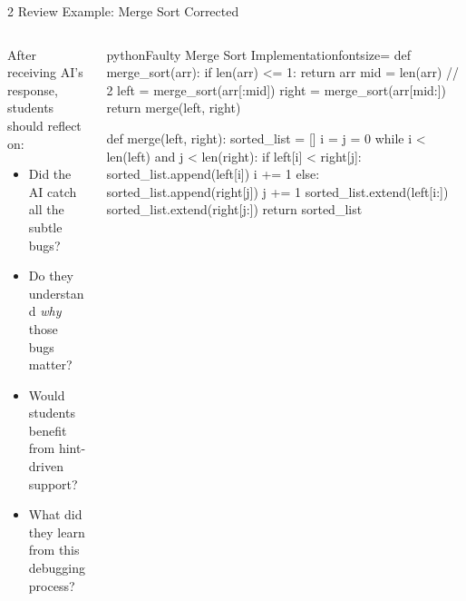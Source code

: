 \documentclass[xcolor=dvipsnames, aspectratio=169]{beamer}
\begin{document}
\begin{frame}[fragile]{2 Review Example: Merge Sort Corrected}
  \begin{columns}[T]
    \begin{column}{0.42\textwidth}
      After receiving AI's response, students should reflect on:
      \begin{itemize}
        \item Did the AI catch all the subtle bugs?
        \item Do they understand \textit{why} those bugs matter?
        \item Would students benefit from hint-driven support?
        \item What did they learn from this debugging process?
      \end{itemize}
    \end{column}
    
    \begin{column}{0.52\textwidth}
      \vspace{-1.5em}
      \begin{codeboxtc}{python}{Faulty Merge Sort Implementation}{}{fontsize=\scriptsize}
    def merge_sort(arr):
        if len(arr) <= 1:
            return arr
        mid = len(arr) // 2
        left = merge_sort(arr[:mid])
        right = merge_sort(arr[mid:])
        return merge(left, right)

    def merge(left, right):
        sorted_list = []
        i = j = 0
        while i < len(left) and j < len(right):
            if left[i] < right[j]:
                sorted_list.append(left[i])
                i += 1
            else:
                sorted_list.append(right[j])
                j += 1
        sorted_list.extend(left[i:])
        sorted_list.extend(right[j:])
        return sorted_list\end{codeboxtc}
    \end{column}
  \end{columns}
\end{frame}
\end{document}
